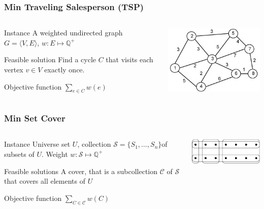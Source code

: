 \documentclass[12pt,aspectratio=169]{beamer}
\begin{document}
\begin{frame}\frametitle{Min Traveling Salesperson (TSP)}
\begin{columns} 
  \begin{column}{0.48\textwidth}
  \begin{block}{Instance}
    A weighted undirected graph $G=\langle V,E \rangle$, $w:E\mapsto \mathbb{Q}^{+}$
  \end{block}
  \begin{block}{Feasible solution}
    Find a cycle $C$ that visits each vertex  $v\in V$ exactly once.
%
  \end{block}
  \begin{block}{Objective function}
    $\sum_{e\in C}w(e)$
  \end{block}
\end{column}
    \begin{column}{0.48\textwidth}
      \centering
  \includegraphics[height=0.5\textheight]{img/tsp}
\end{column}
\end{columns}
\end{frame}

\begin{frame}\frametitle{Min Set Cover }
\begin{columns} 
  \begin{column}{0.48\textwidth}
  \begin{block}{Instance}
    Universe set $U$, collection $\mathcal{S} = \{S_{1}, \ldots , S_{n}\}$of subsets of
    $U$.
    Weight $w: \mathcal{S}\mapsto \mathbb{Q}^{+}$
%
  \end{block}
  \begin{block}{Feasible solutions}
    A cover, that is a subcollection $\mathcal{C}$ of $\mathcal{S}$ that covers all elements of $U$
  \end{block}
  \begin{block}{Objective function}
    $\sum_{C\in \mathcal{C}} w(C)$
  \end{block}
\end{column}
    
    \begin{column}{0.48\textwidth}
      \centering

  \includegraphics[height=0.2\textheight]{img/SetCoverGreedy}
\end{column}
\end{columns}
\end{frame}
\end{document}
